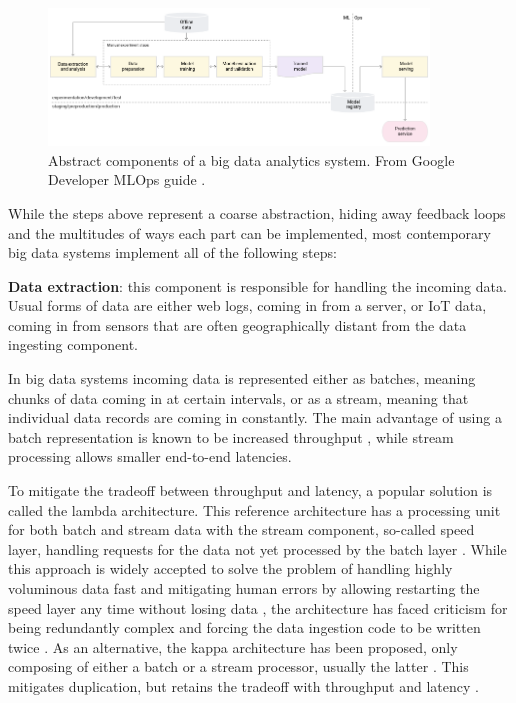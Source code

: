\begin{figure}[ht]
\ \newline
\begin{center}
\includegraphics[width=0.9\textwidth]{simplegoogle.png}
\caption{Abstract components of a big data analytics system. From Google Developer MLOps guide \cite{googlemlops}.}
\label{simplepipeline}
\end{center}
\end{figure}


While the steps above represent a coarse abstraction, hiding away feedback loops and the multitudes of ways each part can be implemented, most contemporary big data systems implement all of the following steps:

\textbf{Data extraction}: this component is responsible for handling the incoming data. Usual forms of data are either web logs, coming in from a server, or IoT data, coming in from sensors that are often geographically distant from the data ingesting component.

In big data systems incoming data is represented either as batches, meaning chunks of data coming in at certain intervals, or as a stream, meaning that individual data records are coming in constantly. The main advantage of using a batch representation is known to be increased throughput%
, while stream processing allows smaller end-to-end latencies. %

To mitigate the tradeoff between throughput and latency, a popular solution is called the lambda architecture. This reference architecture has a processing unit for both batch and stream data with the stream component, so-called speed layer, handling requests for the data not yet processed by the batch layer \cite{beatingcap}. While this approach is widely accepted to solve the problem of handling highly voluminous data fast and mitigating human errors by allowing restarting the speed layer any time without losing data \cite{lambdakappa}, the architecture has faced criticism for being redundantly complex and forcing the data ingestion code to be written twice \cite{questioninglambda} \cite{uber} \cite{facebook}. As an alternative, the kappa architecture has been proposed, only composing of either a batch or a stream processor, usually the latter \cite{questioninglambda}. This mitigates duplication, but retains the tradeoff with throughput and latency \cite{lambdakappa}.

